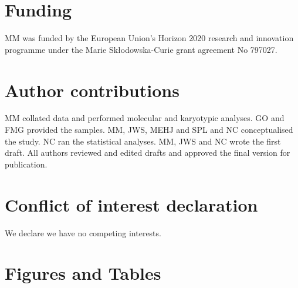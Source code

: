 \documentclass[a4paper, 12pt]{article}
\begin{document}
\section{Funding}
MM was funded by the European Union’s Horizon 2020 research and innovation programme under the Marie Sk\l{}odowska-Curie grant agreement No 797027.

\section{Author contributions}
MM collated data and performed molecular and karyotypic analyses. GO and FMG provided the samples. MM, JWS, MEHJ and SPL and NC conceptualised the study. NC ran the statistical analyses. MM, JWS and NC wrote the first draft. All authors reviewed and edited drafts and approved the final version for publication.

\section{Conflict of interest declaration}
We declare we have no competing interests.




\section{Figures and Tables}


\end{document}
